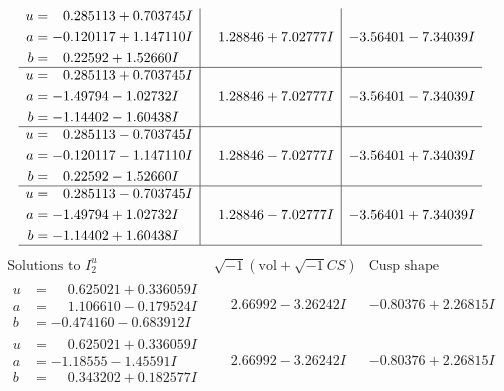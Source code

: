\documentclass[1p]{elsarticle_modified}
\theoremstyle{definition}
\newcommand{\I}{\sqrt{-1}}
\begin{document}
$$\begin{array}{c|c|c}
\begin{aligned}
u &= \phantom{-}0.285113 + 0.703745 I \\
a &= -0.120117 + 1.147110 I \\
b &= \phantom{-}0.22592 + 1.52660 I\end{aligned}
 & \phantom{-}1.28846 + 7.02777 I & -3.56401 - 7.34039 I \\ \hline\begin{aligned}
u &= \phantom{-}0.285113 + 0.703745 I \\
a &= -1.49794 - 1.02732 I \\
b &= -1.14402 - 1.60438 I\end{aligned}
 & \phantom{-}1.28846 + 7.02777 I & -3.56401 - 7.34039 I \\ \hline\begin{aligned}
u &= \phantom{-}0.285113 - 0.703745 I \\
a &= -0.120117 - 1.147110 I \\
b &= \phantom{-}0.22592 - 1.52660 I\end{aligned}
 & \phantom{-}1.28846 - 7.02777 I & -3.56401 + 7.34039 I \\ \hline\begin{aligned}
u &= \phantom{-}0.285113 - 0.703745 I \\
a &= -1.49794 + 1.02732 I \\
b &= -1.14402 + 1.60438 I\end{aligned}
 & \phantom{-}1.28846 - 7.02777 I & -3.56401 + 7.34039 I\\
 \hline 
 \end{array}$$\newpage$$\begin{array}{c|c|c}  
\text{Solutions to }I^u_{2}& \I (\text{vol} + \sqrt{-1}CS) & \text{Cusp shape}\\
 \hline 
\begin{aligned}
u &= \phantom{-}0.625021 + 0.336059 I \\
a &= \phantom{-}1.106610 - 0.179524 I \\
b &= -0.474160 - 0.683912 I\end{aligned}
 & \phantom{-}2.66992 - 3.26242 I & -0.80376 + 2.26815 I \\ \hline\begin{aligned}
u &= \phantom{-}0.625021 + 0.336059 I \\
a &= -1.18555 - 1.45591 I \\
b &= \phantom{-}0.343202 + 0.182577 I\end{aligned}
 & \phantom{-}2.66992 - 3.26242 I & -0.80376 + 2.26815 I \\ \hline\begin{aligned}

\end{aligned}
\end{array}$$
\end{document}
